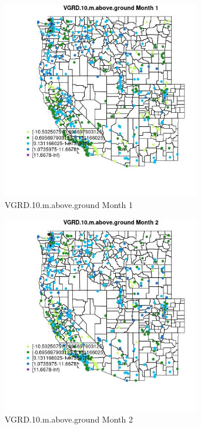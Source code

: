 \begin{figure} 
\centering  
\includegraphics[width=0.77\textwidth]{Code_Outputs/Report_ML_input_PM25_Step4_part_e_de_duplicated_aves_compiled_2019-05-14wNAs_MapObsMo1VGRD10maboveground.jpg} 
\caption{\label{fig:Report_ML_input_PM25_Step4_part_e_de_duplicated_aves_compiled_2019-05-14wNAsMapObsMo1VGRD10maboveground}VGRD.10.m.above.ground Month 1} 
\end{figure} 
 

\clearpage 

\begin{figure} 
\centering  
\includegraphics[width=0.77\textwidth]{Code_Outputs/Report_ML_input_PM25_Step4_part_e_de_duplicated_aves_compiled_2019-05-14wNAs_MapObsMo2VGRD10maboveground.jpg} 
\caption{\label{fig:Report_ML_input_PM25_Step4_part_e_de_duplicated_aves_compiled_2019-05-14wNAsMapObsMo2VGRD10maboveground}VGRD.10.m.above.ground Month 2} 
\end{figure} 
 

